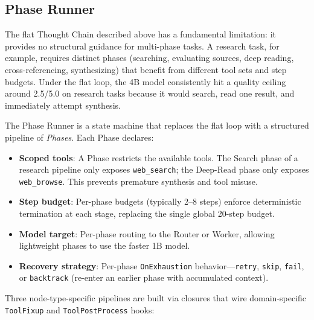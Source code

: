 \documentclass{article}
\begin{document}
\subsection{Phase Runner}
\label{sec:phase_runner}

The flat Thought Chain described above has a fundamental limitation: it provides no structural guidance for multi-phase tasks.
A research task, for example, requires distinct phases (searching, evaluating sources, deep reading, cross-referencing, synthesizing) that benefit from different tool sets and step budgets.
Under the flat loop, the 4B model consistently hit a quality ceiling around 2.5/5.0 on research tasks because it would search, read one result, and immediately attempt synthesis.

The Phase Runner is a state machine that replaces the flat loop with a structured pipeline of \emph{Phases}.
Each Phase declares:

\begin{itemize}[leftmargin=*]
\item \textbf{Scoped tools}: A Phase restricts the available tools.
The Search phase of a research pipeline only exposes \texttt{web\_search}; the Deep-Read phase only exposes \texttt{web\_browse}.
This prevents premature synthesis and tool misuse.
\item \textbf{Step budget}: Per-phase budgets (typically 2--8 steps) enforce deterministic termination at each stage, replacing the single global 20-step budget.
\item \textbf{Model target}: Per-phase routing to the Router or Worker, allowing lightweight phases to use the faster 1B model.
\item \textbf{Recovery strategy}: Per-phase \texttt{OnExhaustion} behavior---\texttt{retry}, \texttt{skip}, \texttt{fail}, or \texttt{backtrack} (re-enter an earlier phase with accumulated context).
\end{itemize}

Three node-type-specific pipelines are built via closures that wire domain-specific \texttt{ToolFixup} and \texttt{ToolPostProcess} hooks:
\end{document}
